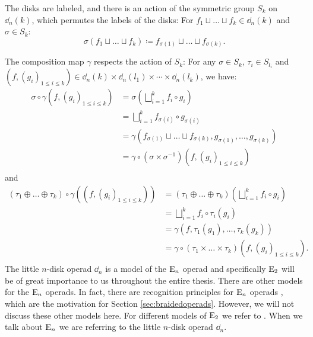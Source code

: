 \begin{egs}
\begin{enumerate}
            The disks are labeled, and there is an action of the symmetric group
            $S_k$ on $\dd_n(k)$, which permutes the labels of the disks: For
            $f_1 \sqcup \dots \sqcup f_k \in \dd_n(k)$ and $\sigma \in S_k$:
            \[
                \sigma (f_1 \sqcup \dots \sqcup f_k) \coloneqq f_{\sigma(1)} \sqcup \dots \sqcup f_{\sigma(k)}.
            \]

            The composition map $\gamma$ respects the action of $S_k$: For any
            $\sigma \in S_k$, $\tau_i \in S_{l_i}$ and $(f, (g_i)_{1 \leq i \leq
            k}) \in \dd_n(k) \times \dd_n(l_1) \times \cdots \times \dd_n(l_k)$,
            we have:
            \begin{align*}
                \sigma \circ \gamma (f, (g_i)_{1 \leq i \leq k}) &= \sigma\left(\bigsqcup_{i=1}^k f_i \circ g_i \right) \\
                &= \bigsqcup_{i=1}^k f_{\sigma(i)}\circ g_{\sigma(i)} \\
                &= \gamma \left( f_{\sigma(1)} \sqcup \dots \sqcup f_{\sigma(k)}, g_{\sigma(1)}, \dots, g_{\sigma(k)}\right) \\
                &= \gamma \circ (\sigma \times \sigma^{-1}) (f, (g_i)_{1 \leq i \leq k}) \\
            \end{align*}
            and 
            \begin{align*}
                (\tau_1 \oplus \dots \oplus \tau_k) \circ \gamma ((f, (g_i)_{1 \leq i \leq k})) &= (\tau_1 \oplus \dots \oplus \tau_k) \left(\bigsqcup_{i=1}^k f_i \circ g_i \right) \\
                &= \bigsqcup_{i=1}^k f_i \circ {\tau_i(g_i)} \\
                &= \gamma \left( f, \tau_1(g_1), \dots, \tau_k(g_k)\right) \\
                &= \gamma \circ (\tau_1 \times \dots \times \tau_k) (f, (g_i)_{1 \leq i \leq k}). \\
            \end{align*}
            The little $n$-disk operad $\dd_n$ is a model of the $\operatorname{E}_n$ operad
            and specifically $\operatorname{E}_2$ will be of great importance to us throughout
            the entire thesis. There are other models for the $\operatorname{E}_n$ operads. In
            fact, there are recognition principles for $\operatorname{E}_n$ operads \cite{EO},
            which are the motivation for Section \ref{sec:braidedoperads}.
            However, we will not discuss these other models here.
            For different models of $\operatorname{E}_2$ we refer to \cite{adrian}.
            When we
            talk about $\operatorname{E}_n$ we are referring to the little $n$-disk operad
            $\dd_n$.
        \end{enumerate}
    \end{egs}

